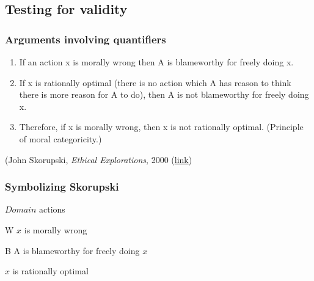 \subsection{Testing for validity}

\begin{frame}
\frametitle{Arguments involving quantifiers}

\begin{enumerate}[<+->]
\item If an action x is morally wrong then
A is blameworthy for freely doing x.
\item If x is rationally optimal (there is no action which A has
  reason to think there is more reason for A to do), then A is not
  blameworthy for freely doing x.
\item Therefore, if x is morally wrong, then
x is not rationally optimal.
(Principle of moral categoricity.)
\end{enumerate}

\begin{raggedleft}
\small(John Skorupski, \textit{Ethical Explorations}, 2000 (\href{http://books.google.ca/books?id=bxIzZYqRZdwC&lpg=PP1&pg=PA170\#v=onepage&q&f=false}{link})
 \end{raggedleft}

\end{frame}

\begin{frame}
  \frametitle{Symbolizing Skorupski}

  \begin{enumerate}
    \end{enumerate}

  \begin{ekey}
  \item[$Domain$] actions
  \item[W\qv{x}] $x$ is morally wrong
  \item[B\qv{x}] A is blameworthy for freely doing $x$
  \item<3->[O\qv{x}] $x$ is rationally optimal
  \end{ekey}
  \begin{earg}
  \item<1->[] 
  \item<3->[] 
  \item<5->[\therefore] 
  \end{earg}

  \end{frame}

